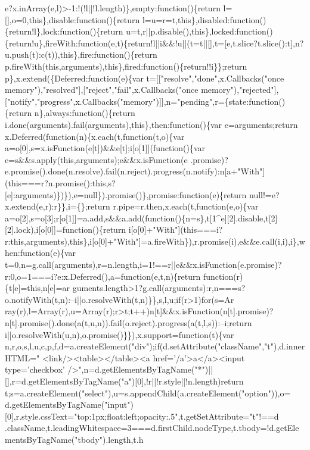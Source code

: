 \begin{DoxyCode}
{       e?x.inArray(e,l)>-1:!(!l||!l.length)\},empty:function()\{return l=[],o=0,this\},disable:function()\{return
       l=u=r=t,this\},disabled:function()\{return!l\},lock:function()\{return
       u=t,r||p.disable(),this\},locked:function()\{return!u\},fireWith:function(e,t)\{return!l||i&&!u||(t=t||[],t=[e,t.slice?t.slice():t],n?u.push(t):c(t)),this\},fire:function()\{return
       p.fireWith(this,arguments),this\},fired:function()\{return!!i\}\};return p\},x.extend(\{Deferred:function(e)\{var
       t=[["resolve","done",x.Callbacks("once memory"),"resolved"],["reject","fail",x.Callbacks("once
       memory"),"rejected"],["notify","progress",x.Callbacks("memory")]],n="pending",r=\{state:function()\{return n\},always:function()\{return
       i.done(arguments).fail(arguments),this\},then:function()\{var e=arguments;return
       x.Deferred(function(n)\{x.each(t,function(t,o)\{var a=o[0],s=x.isFunction(e[t])&&e[t];i[o[1]](function()\{var
       e=s&&s.apply(this,arguments);e&&x.isFunction(e
      .promise)?e.promise().done(n.resolve).fail(n.reject).progress(n.notify):n[a+"With"](this===r?n.promise():this,s?[e]:arguments)\})\}),e=null\}).promise()\},promise:function(e)\{return null!=e?x.extend(e,r):r\}\},i=\{\};return
       r.pipe=r.then,x.each(t,function(e,o)\{var
       a=o[2],s=o[3];r[o[1]]=a.add,s&&a.add(function()\{n=s\},t[1^e][2].disable,t[2][2].lock),i[o[0]]=function()\{return
       i[o[0]+"With"](this===i?r:this,arguments),this\},i[o[0]+"With"]=a.fireWith\}),r.promise(i),e&&e.call(i,i),i\},when:function(e)\{var
       t=0,n=g.call(arguments),r=n.length,i=1!==r||e&&x.isFunction(e.promise)?r:0,o=1===i?e:x.Deferred(),a=function(e,t,n)\{return
       function(r)\{t[e]=this,n[e]=ar
      guments.length>1?g.call(arguments):r,n===s?o.notifyWith(t,n):--i||o.resolveWith(t,n)\}\},s,l,u;if(r>1)for(s=Ar
      ray(r),l=Array(r),u=Array(r);r>t;t++)n[t]&&x.isFunction(n[t].promise)?n[t].promise().done(a(t,u,n)).fail(o.reject).progress(a(t,l,s)):--i;return i||o.resolveWith(u,n),o.promise()\}\}),x.support=function(t)\{var
       n,r,o,s,l,u,c,p,f,d=a.createElement("div");if(d.setAttribute("className","t"),d.innerHTML=" 
       <link/><table></table><a href='}/a\textcolor{stringliteral}{'>a</a><input type='}checkbox\textcolor{stringliteral}{'
      />",n=d.getElementsByTagName("*")||[],r=d.getElementsByTagName("a")[0],!r||!r.style||!n.length)return
       t;s=a.createElement("select"),u=s.appendChild(a.createElement("option")),o=
      d.getElementsByTagName("input")[0],r.style.cssText="top:1px;float:left;opacity:.5",t.getSetAttribute="t"!==d
      .className,t.leadingWhitespace=3===d.firstChild.nodeType,t.tbody=!d.getElementsByTagName("tbody").length,t.h
}
\end{DoxyCode}
